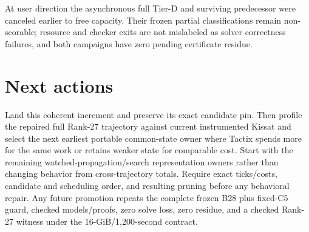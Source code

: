 \documentclass[11pt]{article}
\newcommand{\code}[1]{\texttt{\detokenize{#1}}}
\begin{document}
At user direction the asynchronous full Tier-D and surviving predecessor were
canceled earlier to free capacity.  Their frozen partial classifications remain
non-scorable; resource and checker exits are not mislabeled as solver
correctness failures, and both campaigns have zero pending certificate residue.

\section{Next actions}
Land this coherent increment and preserve its exact candidate pin.  Then profile
the repaired full Rank-27 trajectory against current instrumented Kissat and
select the next earliest portable common-state owner where Tactix spends more
for the same work or retains weaker state for comparable cost.  Start with the
remaining watched-propagation/search representation owners rather than changing
behavior from cross-trajectory totals.  Require exact ticks/costs, candidate and
scheduling order, and resulting pruning before any behavioral repair.  Any
future promotion repeats the complete frozen B28 plus fixed-C5 guard, checked
models/proofs, zero solve loss, zero residue, and a checked \code{-c 2} Rank-27
witness under the 16-GiB/1,200-second contract.
\end{document}
